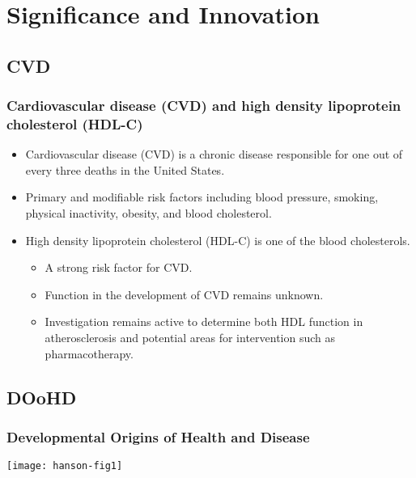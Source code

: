\documentclass[10pt]{beamer}\usepackage[]{graphicx}\usepackage[]{color}
\title[Infant growth trajectories and adolescent HDL-C]{Infant growth trajectories and high density lipoprotein cholesterol levels in adolescence. \rule[-1\normalbaselineskip]{0pt}{0pt}}
\author[vonholle@email.unc.edu]{\small Ann Von Holle}
\begin{document}

\begin{frame}
\titlepage
\centering
\end{frame}

\section{Significance and Innovation}


\subsection{CVD}
\begin{frame}
\frametitle{Cardiovascular disease (CVD) and high density lipoprotein cholesterol (HDL-C)}
\begin{itemize}
\item Cardiovascular disease (CVD) is a chronic disease responsible for one out of every three deaths in the United States.
\smallskip
\item Primary and modifiable risk factors including blood pressure, smoking, physical inactivity, obesity, and blood cholesterol. 
\smallskip
\item High density lipoprotein cholesterol (HDL-C) is one of the blood cholesterols.
	\begin{itemize}
		\item A strong risk factor for CVD.
		\item Function in the development of CVD remains unknown.
		\item Investigation remains active to determine both HDL function in atherosclerosis and potential areas for intervention such as pharmacotherapy.
		\end{itemize}
	\end{itemize}
\end{frame}


\subsection{DOoHD}
\begin{frame}
\frametitle{Developmental Origins of Health and Disease}
\centering
\texttt{[image: hanson-fig1]}
\end{frame}
\end{document}
